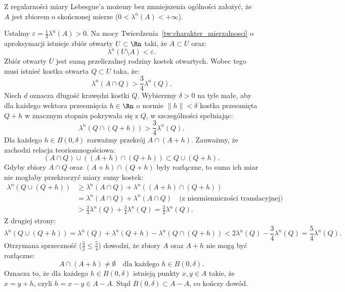 \begin{dow}
    Z regularności miary Lebesgue'a możemy bez zmniejszenia ogólności założyć, że $A$ jest zbiorem o skończonej mierze ($0 < \lambda^n(A) < +\infty$).

    Ustalmy $\varepsilon = \frac{1}{3} \lambda^n(A) > 0$. Na mocy Twierdzenia~\ref{tw:charakter_mierzalnosci} o aproksymacji istnieje zbiór otwarty $U \subset \Rn$ taki, że $A \subset U$ oraz:
    \begin{equation*}
        \lambda^n(U \setminus A) < \varepsilon.
    \end{equation*}
    Zbiór otwarty $U$ jest sumą przeliczalnej rodziny kostek otwartych. Wobec tego musi istnieć kostka otwarta $Q \subset U$ taka, że:
    \begin{equation*}
        \lambda^n(A \cap Q) > \frac{3}{4} \lambda^n(Q).
    \end{equation*}
    Niech $d$ oznacza długość krawędzi kostki $Q$. Wybierzmy $\delta > 0$ na tyle małe, aby dla każdego wektora przesunięcia $h \in \Rn$ o normie $\|h\| < \delta$ kostka przesunięta $Q + h$ w znacznym stopniu pokrywała się z $Q$, w szczególności spełniając:
    \begin{equation*}
        \lambda^n(Q \cap (Q + h)) > \frac{3}{4} \lambda^n(Q).
    \end{equation*}
    Dla każdego $h \in B(0, \delta)$ rozważmy przekrój $A \cap (A + h)$. Zauważmy, że zachodzi relacja teoriomnogościowa:
    \begin{equation*}
        (A \cap Q) \cup ((A + h) \cap (Q + h)) \subset Q \cup (Q + h).
    \end{equation*}
    Gdyby zbiory $A \cap Q$ oraz $(A + h) \cap (Q + h)$ były rozłączne, to suma ich miar nie mogłaby przekroczyć miary sumy kostek:
    \begin{align*}
        \lambda^n(Q \cup (Q + h)) & \ge \lambda^n(A \cap Q) + \lambda^n((A + h) \cap (Q + h))                                   \\
                                  & = \lambda^n(A \cap Q) + \lambda^n(A \cap Q) \quad \text{(z niezmienniczości translacyjnej)} \\
                                  & > \frac{3}{4} \lambda^n(Q) + \frac{3}{4} \lambda^n(Q) = \frac{3}{2} \lambda^n(Q).
    \end{align*}
    Z drugiej strony:
    \begin{equation*}
        \lambda^n(Q \cup (Q + h)) = \lambda^n(Q) + \lambda^n(Q + h) - \lambda^n(Q \cap (Q + h)) < 2\lambda^n(Q) - \frac{3}{4}\lambda^n(Q) = \frac{5}{4} \lambda^n(Q).
    \end{equation*}
    Otrzymana sprzeczność ($\frac{3}{2} \le \frac{5}{4}$) dowodzi, że zbiory $A$ oraz $A + h$ nie mogą być rozłączne:
    \begin{equation*}
        A \cap (A + h) \neq \emptyset \quad \text{dla każdego } h \in B(0, \delta).
    \end{equation*}
    Oznacza to, że dla każdego $h \in B(0, \delta)$ istnieją punkty $x, y \in A$ takie, że $x = y + h$, czyli $h = x - y \in A - A$. Stąd $B(0, \delta) \subset A - A$, co kończy dowód.
\end{dow}

